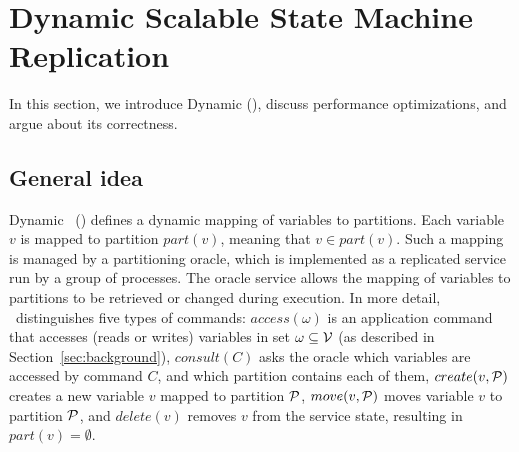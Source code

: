 \section{Dynamic Scalable State Machine Replication}

In this section, we introduce Dynamic \ssmr{} (\dssmr), discuss performance optimizations, and argue about its correctness.

\subsection{General idea}
\label{sec:generalidea}

%

Dynamic \ssmr\ (\dssmr) defines a dynamic mapping of variables to partitions.
Each variable $v$ is mapped to partition $part(v)$, meaning that $v \in part(v)$.
Such a mapping is managed by a partitioning oracle, which is implemented as a replicated service run by a group of processes.
The oracle service allows the mapping of variables to partitions to be retrieved or changed during execution.
In more detail, \dssmr\ distinguishes five types of commands:
$access(\omega)$ is an application command that accesses (reads or writes) variables in set $\omega \subseteq \mathcal{V}$ (as described in Section~\ref{sec:background}),
$consult(C)$ asks the oracle which variables are accessed by command $C$, and which partition contains each of them,
$create(v, \mathcal{P})$ creates a new variable $v$ mapped to partition $\mathcal{P}$,
$move(v,\mathcal{P})$ moves variable $v$ to partition $\mathcal{P}$,
and $delete(v)$ removes $v$ from the service state, resulting in $part(v) = \emptyset$.

